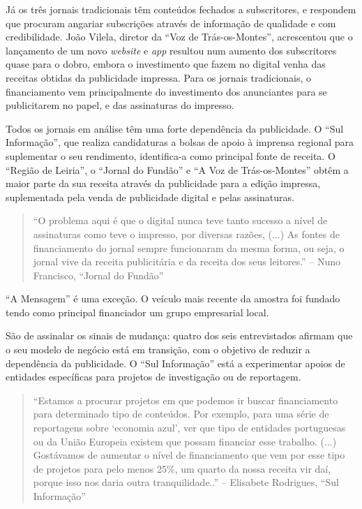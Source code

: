 \documentclass[portuguese]{textolivre}
\begin{document}
Já os três jornais tradicionais têm conteúdos fechados a subscritores, e
respondem que procuram angariar subscrições através de informação de
qualidade e com credibilidade. João Vilela, diretor da ``Voz de
Trás-os-Montes'', acrescentou que o lançamento de um novo \emph{website}
e \emph{app} resultou num aumento dos subscritores quase para o dobro,
embora o investimento que fazem no digital venha das receitas obtidas da
publicidade impressa. Para os jornais tradicionais, o financiamento vem
principalmente do investimento dos anunciantes para se publicitarem no
papel, e das assinaturas do impresso.

Todos os jornais em análise têm uma forte dependência da publicidade. O
``Sul Informação'', que realiza candidaturas a bolsas de apoio à
imprensa regional para suplementar o seu rendimento, identifica-a como
principal fonte de receita. O ``Região de Leiria'', o ``Jornal do
Fundão'' e ``A Voz de Trás-os-Montes'' obtêm a maior parte da sua
receita através da publicidade para a edição impressa, suplementada pela
venda de publicidade digital e pelas assinaturas.

\begin{quote}
``O problema aqui é que o digital nunca teve tanto sucesso a nível de
assinaturas como teve o impresso, por diversas razões, (...) As fontes
de financiamento do jornal sempre funcionaram da mesma forma, ou seja, o
jornal vive da receita publicitária e da receita dos seus leitores.'' --
Nuno Francisco, ``Jornal do Fundão''
\end{quote}

``A Mensagem'' é uma exceção. O veículo mais recente da amostra foi
fundado tendo como principal financiador um grupo empresarial local.

São de assinalar os sinais de mudança: quatro dos seis entrevistados
afirmam que o seu modelo de negócio está em transição, com o objetivo de
reduzir a dependência da publicidade. O ``Sul Informação'' está a
experimentar apoios de entidades específicas para projetos de
investigação ou de reportagem.

\begin{quote}
``Estamos a procurar projetos em que podemos ir buscar financiamento
para determinado tipo de conteúdos. Por exemplo, para uma série de
reportagens sobre `economia azul', ver que tipo de entidades portuguesas
ou da União Europeia existem que possam financiar esse trabalho. (...)
Gostávamos de aumentar o nível de financiamento que vem por esse tipo de
projetos para pelo menos 25\%, um quarto da nossa receita vir daí,
porque isso nos daria outra tranquilidade..'' -- Elisabete Rodrigues,
``Sul Informação''
\end{quote}
\end{document}
